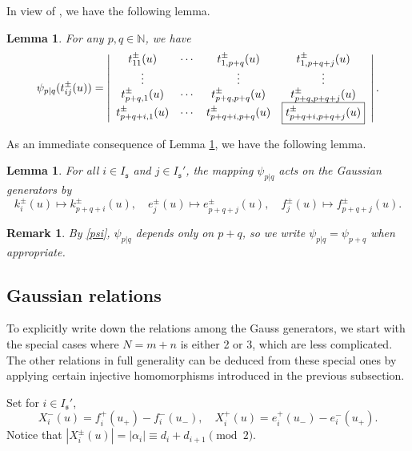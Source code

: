 \documentclass[a4paper,12pt]{article}
\newtheorem{lemm}[theo]{Lemma}
\newtheorem{rema}[theo]{Remark}
\numberwithin{equation}{section}
\begin{document}
In view of \cite[Lemma 4.1]{P16}, we have the following lemma.
\begin{lemm}\label{Hom 3}
For any $p,q\in\mathbb{N}$, we have
\begin{equation} \label{psi}
\psi_{p|q}(t^{\pm}_{ij}(u))=\left|\begin{array}{cccc}
	t^{\pm}_{11}(u)&\cdots&t^{\pm}_{1,p+q}(u)&t^{\pm}_{1,p+q+j}(u)\\
	\vdots&&\vdots&\vdots\\
	t^{\pm}_{p+q,1}(u)&\cdots&t^{\pm}_{p+q,p+q}(u)&t^{\pm}_{p+q,p+q+j}(u)\\ t^{\pm}_{p+q+i,1}(u)&\cdots&t^{\pm}_{p+q+i,p+q}(u)&\framebox{$t^{\pm}_{p+q+i,p+q+j}(u)$}\\
\end{array}\right|.
\end{equation}
\end{lemm}

As an immediate consequence of Lemma \ref{Hom 3}, we have the following lemma.

\begin{lemm}\label{Hom 4}
For all $i\in I_{\mathfrak{s}}$ and $j\in I_{\mathfrak{s}}'$, the mapping $\psi_{p|q}$ acts on the Gaussian generators by 
$$
k_{i}^{\pm}(u)\mapsto k_{p+q+i}^{\pm}(u),\quad e_{j}^{\pm}(u)\mapsto e_{p+q+j}^{\pm}(u),\quad f_{j}^{\pm}(u)\mapsto f_{p+q+j}^{\pm}(u).
$$
\end{lemm}

\begin{rema}
By \eqref{psi}, $\psi_{p|q}$ depends only on $p+q$, so we write $\psi_{p|q}=\psi_{p+q}$ when appropriate.
\end{rema}


\subsection{Gaussian relations}

To explicitly write down the relations among the Gauss generators, we start with the special cases where $N=m+n$ is either 2 or 3, which are less complicated. The other relations in full generality can be deduced from these special ones by applying certain injective homomorphisms introduced in the previous subsection. 

Set for $i\in I_{\mathfrak{s}}'$,
\begin{equation*}
X_{i}^{-}(u)=f_{i}^{+}(u_{+})-f_{i}^{-}(u_{-}),\quad X_{i}^{+}(u)=e_{i}^{+}(u_{-})-e_{i}^{-}(u_{+}).
\end{equation*}
 Notice that $|X_i^\pm(u)| = |\alpha_i| \equiv d_i+d_{i+1} \pmod 2$.
\end{document}
